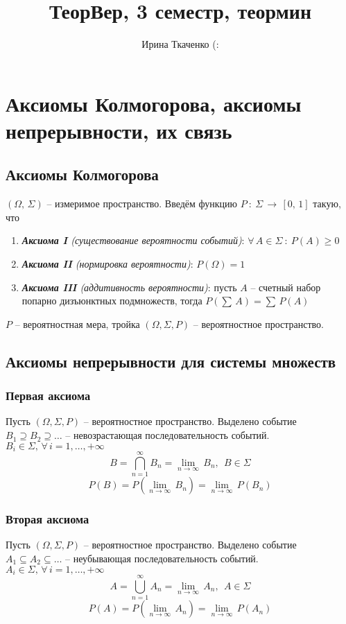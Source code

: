 \documentclass{article}
\title{ТеорВер, 3 семестр, теормин}
\author{Ирина Ткаченко (:}
\begin{document}
\maketitle 
\tableofcontents
\newpage
\section{Аксиомы Колмогорова, аксиомы непрерывности, их связь}
\subsection{Аксиомы Колмогорова}
$(\Omega,\,\Sigma)$ -- измеримое пространство. Введём функцию $P\::\:\Sigma\,\to\,[0,\,1]$ такую, что
\begin{enumerate}
    \item \textit{\textbf{Аксиома I} (существование вероятности событий)}: $\forall\,A\in\Sigma\::\:P(A)\geq0$
    \item \textit{\textbf{Аксиома II} (нормировка вероятности)}: $P(\Omega)=1$
    \item \textit{\textbf{Аксиома III} (аддитивность вероятности)}: пусть $A$ --  счетный набор попарно дизъюнктных подмножеств, тогда $P(\sum\,A)=\sum\,P(A)$
\end{enumerate}
$P$ -- вероятностная мера, тройка $(\Omega,\Sigma,P)$ -- вероятностное пространство.
\subsection{Аксиомы непрерывности для системы множеств}
\subsubsection{Первая аксиома}
Пусть $(\Omega,\Sigma,P)$ -- вероятностное пространство. Выделено событие $B_1\supseteq B_2\supseteq \dots$ -- невозрастающая последовательность событий. $B_i\in\Sigma,\,\forall\,i=1,\dots,+\infty$
\[
B=\bigcap_{n=1}^{\infty} B_{n}=\lim_{n\to\infty}\,B_n,\:\:B\in\Sigma
\] 
$$ P(B)=P(\lim_{n\to\infty}\,B_n)=\lim_{n\to\infty}\,P(B_n) $$
\subsubsection{Вторая аксиома}
Пусть $(\Omega,\Sigma,P)$ -- вероятностное пространство. Выделено событие $A_1\subseteq A_2\subseteq \dots$ -- неубывающая последовательность событий. $A_i\in\Sigma,\,\forall\,i=1,\dots,+\infty$
$$ A=\bigcup_{n=1}^{\infty} A_{n}=\lim_{n\to\infty}\,A_n,\:\:A\in\Sigma $$
$$ P(A)=P(\lim_{n\to\infty}\,A_n)=\lim_{n\to\infty}\,P(A_n) $$
\end{document}
